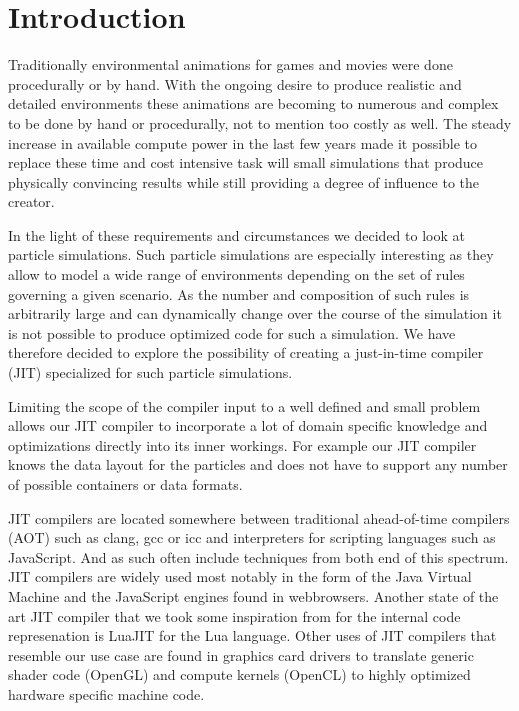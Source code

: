 \section{Introduction}\label{sec:intro}

Traditionally environmental animations for games and movies were done procedurally or by hand. With the ongoing desire to produce realistic and detailed environments these animations are becoming to numerous and complex to be done by hand or procedurally, not to mention too costly as well. The steady increase in available compute power in the last few years made it possible to replace these time and cost intensive task will small simulations that produce physically convincing results while still providing a degree of influence to the creator.

In the light of these requirements and circumstances we decided to look at particle simulations. Such particle simulations are especially interesting as they allow to model a wide range of environments depending on the set of rules governing a given scenario. As the number and composition of such rules is arbitrarily large and can dynamically change over the course of the simulation it is not possible to produce optimized code for such a simulation. We have therefore decided to explore the possibility of creating a just-in-time compiler (JIT) specialized for such particle simulations.

Limiting the scope of the compiler input to a well defined and small problem allows our JIT compiler to incorporate a lot of domain specific knowledge and optimizations directly into its inner workings. For example our JIT compiler knows the data layout for the particles and does not have to support any number of possible containers or data formats.

JIT compilers are located somewhere between traditional ahead-of-time compilers (AOT) such as clang, gcc or icc and interpreters for scripting languages such as JavaScript. And as such often include techniques from both end of this spectrum. JIT compilers are widely used most notably in the form of the Java Virtual Machine and the JavaScript engines found in webbrowsers. Another state of the art JIT compiler that we took some inspiration from for the internal code represenation is LuaJIT for the Lua language. Other uses of JIT compilers that resemble our use case are found in graphics card drivers to translate generic shader code (OpenGL) and compute kernels (OpenCL) to highly optimized hardware specific machine code.


